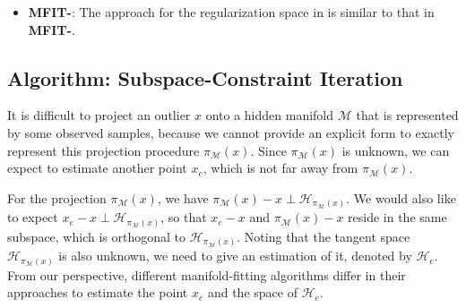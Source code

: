 \documentclass[aos,preprint]{imsart}
\theoremstyle{remark}
\begin{document}
\begin{appendix}
\begin{itemize}
\item{\bf MFIT-}: The approach for the regularization space in \cite{yao2019manifold}  is similar to that in {\bf MFIT-}.

\end{itemize}
\begin{table}[t]
 \end{table}

\subsection{Algorithm: Subspace-Constraint Iteration}
It is difficult to project an outlier ${x}$ onto a hidden manifold $\mathcal M$ that is represented by some observed samples, because we cannot provide an explicit form to exactly represent this projection procedure $\pi_{\mathcal M}({x})$. Since $\pi_{\mathcal M}({x})$ is unknown, we can expect to estimate another point $x_e$, which is not far away from $\pi_{\mathcal M}({x})$. 

For the projection $\pi_{\mathcal M}({x})$, we have $\pi_{\mathcal M}({x})-{x} \perp {\mathcal H}_{\pi_{\mathcal M}({x})}$. We would also like to expect $x_e-{x}\perp {\mathcal H}_{\pi_{\mathcal M}({x})}$, so that $x_e-{x}$ and $\pi_{\mathcal M}({x})-{x}$ reside in the same subspace, which is orthogonal to ${\mathcal H}_{\pi_{\mathcal M}({x})}$. Noting that the tangent space ${\mathcal H}_{\pi_{\mathcal M}({x})}$ is also unknown, we need to give an estimation of it, denoted by ${\mathcal H}_e$.
From our perspective, different manifold-fitting algorithms differ in their approaches to estimate the point $x_e$ and the space of ${\mathcal H}_e$.


\end{appendix}
\end{document}
